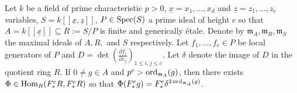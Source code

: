 \documentclass[12pt]{amsart}
\numberwithin{equation}{theorem}
\theoremstyle{plain}
\newcommand{\fm}{\mathfrak{m}}
\begin{document}
\begin{corollary}
    \label{cor: mapping to discriminant power}
    Let $k$ be a field of prime characteristic $p>0$, $\underline{x} = x_1,\ldots,x_d$ and $\underline{z} = z_1,\ldots,z_c$ variables, $S = k[[\underline{x},\underline{z}]]$, $P\in\operatorname{{Spec}}(S)$ a prime ideal of height $c$ so that $A=k[[\underline{x}]]\subseteq R:=S/P$ is finite and generically \'{e}tale. Denote by $\fm_A,\fm_R,\fm_S$ the maximal ideals of $A, R,$ and $S$ respectively. Let $f_1,\ldots,f_c\in P$ be local generators of $P$ and $D=\det(\frac{\partial f_i}{\partial z_j})_{1\leq i,j\leq c}$. Let $\delta$ denote the image of $D$ in the quotient ring $R$. If $0\not=g\in A$ and $p^e>\ord_{\fm_A}(g)$, then there exists $\Phi\in\operatorname{Hom}_R(F^e_*R,F^e_*R)$ so that $\Phi(F^e_*g) = F^e_*\delta^{2\ord_{\fm_A}(g)}$.
\end{corollary}
\end{document}
